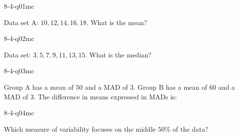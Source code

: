 

\begin{practiceQuestion}{8-4-q01}{mc}
\begin{questionText}
Data set A: $10, 12, 14, 16, 18$. What is the mean?
\end{questionText}
\end{practiceQuestion}

\begin{practiceQuestion}{8-4-q02}{mc}
\begin{questionText}
Data set: $3, 5, 7, 9, 11, 13, 15$. What is the median?
\end{questionText}
\end{practiceQuestion}

\begin{practiceQuestion}{8-4-q03}{mc}
\begin{questionText}
Group A has a mean of $50$ and a MAD of $3$. Group B has a mean of $60$ and a MAD of $3$. The difference in means expressed in MADs is:
\end{questionText}
\end{practiceQuestion}

\begin{practiceQuestion}{8-4-q04}{mc}
\begin{questionText}
Which measure of variability focuses on the middle $50\%$ of the data?
\end{questionText}
\end{practiceQuestion}

